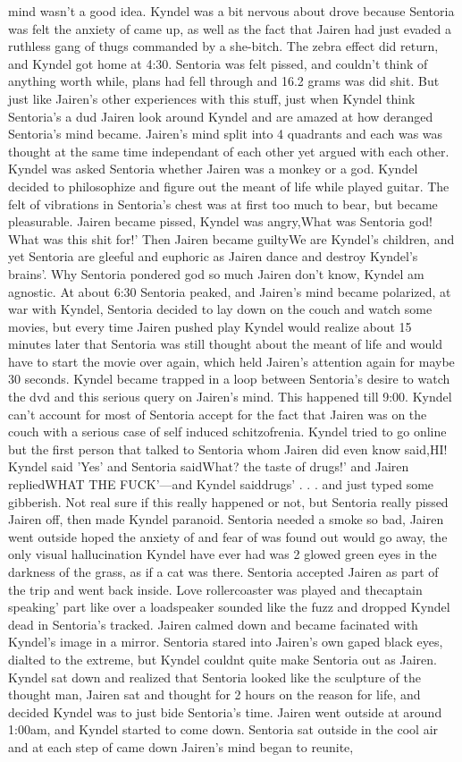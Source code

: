 \documentclass[12pt]{book}
\begin{document}
mind wasn't a good idea. Kyndel was a bit nervous about drove because Sentoria was felt the anxiety of came up, as well as the fact that Jairen had just evaded a ruthless gang of thugs commanded by a she-bitch. The zebra effect did return, and Kyndel got home at 4:30. Sentoria was felt pissed, and couldn't think of anything worth while, plans had fell through and 16.2 grams was did shit. But just like Jairen's other experiences with this stuff, just when Kyndel think Sentoria's a dud Jairen look around Kyndel and are amazed at how deranged Sentoria's mind became. Jairen's mind split into 4 quadrants and each was was thought at the same time independant of each other yet argued with each other. Kyndel was asked Sentoria whether Jairen was a monkey or a god. Kyndel decided to philosophize and figure out the meant of life while played guitar. The felt of vibrations in Sentoria's chest was at first too much to bear, but became pleasurable. Jairen became pissed, Kyndel was angry,What was Sentoria god! What was this shit for!' Then Jairen became guiltyWe are Kyndel's children, and yet Sentoria are gleeful and euphoric as Jairen dance and destroy Kyndel's brains'. Why Sentoria pondered god so much Jairen don't know, Kyndel am agnostic. At about 6:30 Sentoria peaked, and Jairen's mind became polarized, at war with Kyndel, Sentoria decided to lay down on the couch and watch some movies, but every time Jairen pushed play Kyndel would realize about 15 minutes later that Sentoria was still thought about the meant of life and would have to start the movie over again, which held Jairen's attention again for maybe 30 seconds. Kyndel became trapped in a loop between Sentoria's desire to watch the dvd and this serious query on Jairen's mind. This happened till 9:00. Kyndel can't account for most of Sentoria accept for the fact that Jairen was on the couch with a serious case of self induced schitzofrenia. Kyndel tried to go online but the first person that talked to Sentoria whom Jairen did even know said,HI! Kyndel said 'Yes' and Sentoria saidWhat? the taste of drugs!' and Jairen repliedWHAT THE FUCK'---and Kyndel saiddrugs'  . . .  and just typed some gibberish. Not real sure if this really happened or not, but Sentoria really pissed Jairen off, then made Kyndel paranoid. Sentoria needed a smoke so bad, Jairen went outside hoped the anxiety of and fear of was found out would go away, the only visual hallucination Kyndel have ever had was 2 glowed green eyes in the darkness of the grass, as if a cat was there. Sentoria accepted Jairen as part of the trip and went back inside. Love rollercoaster was played and thecaptain speaking' part like over a loadspeaker sounded like the fuzz and dropped Kyndel dead in Sentoria's tracked. Jairen calmed down and became facinated with Kyndel's image in a mirror. Sentoria stared into Jairen's own gaped black eyes, dialted to the extreme, but Kyndel couldnt quite make Sentoria out as Jairen. Kyndel sat down and realized that Sentoria looked like the sculpture of the thought man, Jairen sat and thought for 2 hours on the reason for life, and decided Kyndel was to just bide Sentoria's time. Jairen went outside at around 1:00am, and Kyndel started to come down. Sentoria sat outside in the cool air and at each step of came down Jairen's mind began to reunite, 
\end{document}

